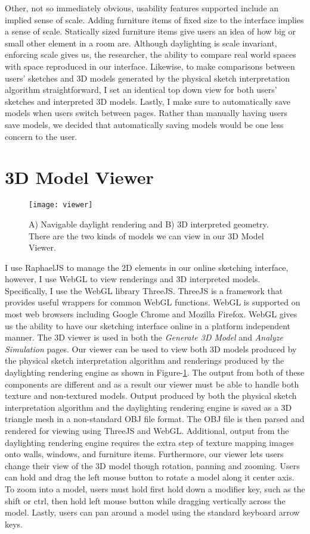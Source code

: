 		Other, not so immediately obvious, usability features supported include an implied sense of scale.
		Adding furniture items of fixed size to the interface implies a sense of scale.
		Statically sized furniture items give users an idea of how big or small other element in a room are.
		Although daylighting is scale invariant, enforcing scale gives us, the researcher, the ability to compare real world spaces with space reproduced in our interface.
		Likewise, to make comparisons between users' sketches and 3D models generated by the physical sketch interpretation algorithm straightforward, I set an identical top down view for both users' sketches and interpreted 3D models.
		Lastly, I make sure to automatically save models when users switch between pages.
		Rather than manually having users save models, we decided that automatically saving models would be one less concern to the user.


\section{3D Model Viewer}

	\begin{figure}[h]
	\centering
	\texttt{[image: viewer]}
	\caption{ A) Navigable daylight rendering and B) 3D interpreted geometry. There are the two kinds of models we can view in our 3D Model Viewer.}
	\label{fig:viewer}
	\end{figure}

	I use RaphaelJS to manage the 2D elements in our online sketching interface, however, I use WebGL to view renderings and 3D interpreted models. 
	Specifically, I use the WebGL library ThreeJS\cite{}.
	ThreeJS is a framework that provides useful wrappers for common WebGL functions.
	WebGL is supported on most web browsers including Google Chrome and Mozilla Firefox\cite{}.
	WebGL gives us the ability to have our sketching interface online in a platform independent manner.
	The 3D viewer is used in both the \textit{Generate 3D Model} and \textit{Analyze Simulation} pages.
	Our viewer can be used to view both 3D models produced by the physical sketch interpretation algorithm and renderings produced by the daylighting rendering engine as shown in Figure-\ref{fig:viewer}.
	The output from both of these components are different and as a result our viewer must be able to handle both texture and non-textured models.
	Output produced by both the physical sketch interpretation algorithm and the daylighting rendering engine is saved as a 3D triangle mesh in a non-standard OBJ file format.
	The OBJ file is then parsed and rendered for viewing using ThreeJS and WebGL.
	Additional, output from the daylighting rendering engine requires the extra step of texture mapping images onto walls, windows, and furniture items.
	Furthermore, our viewer lets users change their view of the 3D model though rotation, panning and zooming.
	Users can hold and drag  the left mouse button to rotate a model along it center axis.
	To zoom into a model, users must hold first hold down a modifier key, such as the shift or ctrl, then hold left mouse button while dragging vertically across the model.
	Lastly, users can pan around a model using the standard keyboard arrow keys.


